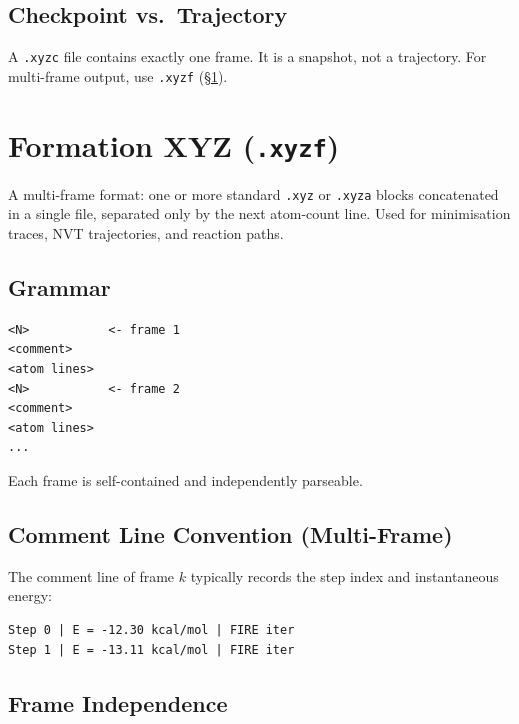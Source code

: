 \documentclass[12pt, a4paper, oneside]{article}
\begin{document}
\subsection{Checkpoint vs.\ Trajectory}

A \texttt{.xyzc} file contains exactly one frame.  It is a snapshot,
not a trajectory.  For multi-frame output, use \texttt{.xyzf}
(§\ref{sec:xyzf}).

\section{Formation XYZ (\texttt{.xyzf})}
\label{sec:xyzf}

A multi-frame format: one or more standard \texttt{.xyz} or
\texttt{.xyza} blocks concatenated in a single file, separated only
by the next atom-count line.  Used for minimisation traces, NVT
trajectories, and reaction paths.

\subsection{Grammar}

\begin{lstlisting}[language={},frame=single]
<N>           <- frame 1
<comment>
<atom lines>
<N>           <- frame 2
<comment>
<atom lines>
...
\end{lstlisting}

Each frame is self-contained and independently parseable.

\subsection{Comment Line Convention (Multi-Frame)}

The comment line of frame $k$ typically records the step index and
instantaneous energy:

\begin{lstlisting}[language={},frame=single]
Step 0 | E = -12.30 kcal/mol | FIRE iter
Step 1 | E = -13.11 kcal/mol | FIRE iter
\end{lstlisting}

\subsection{Frame Independence}
\end{document}
